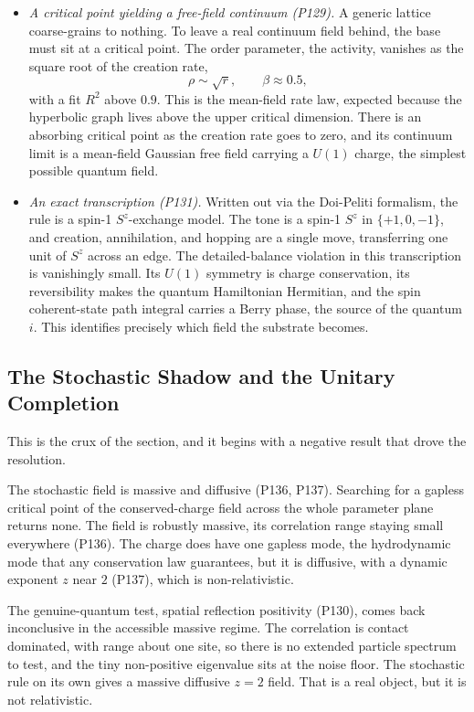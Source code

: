 \begin{itemize}
\item \emph{A critical point yielding a free-field continuum (P129).} A generic lattice coarse-grains to nothing. To leave a real continuum field behind, the base must sit at a critical point. The order parameter, the activity, vanishes as the square root of the creation rate,
\begin{equation}
\rho \sim \sqrt{r}, \qquad \beta \approx 0.5,
\end{equation}
with a fit $R^2$ above $0.9$. This is the mean-field rate law, expected because the hyperbolic graph lives above the upper critical dimension. There is an absorbing critical point as the creation rate goes to zero, and its continuum limit is a mean-field Gaussian free field carrying a $U(1)$ charge, the simplest possible quantum field.

\item \emph{An exact transcription (P131).} Written out via the Doi-Peliti formalism, the rule is a spin-1 $S^z$-exchange model. The tone is a spin-1 $S^z$ in $\{+1,0,-1\}$, and creation, annihilation, and hopping are a single move, transferring one unit of $S^z$ across an edge. The detailed-balance violation in this transcription is vanishingly small. Its $U(1)$ symmetry is charge conservation, its reversibility makes the quantum Hamiltonian Hermitian, and the spin coherent-state path integral carries a Berry phase, the source of the quantum $i$. This identifies precisely which field the substrate becomes.
\end{itemize}

\subsection{The Stochastic Shadow and the Unitary Completion}

This is the crux of the section, and it begins with a negative result that drove the resolution.

The stochastic field is massive and diffusive (P136, P137). Searching for a gapless critical point of the conserved-charge field across the whole parameter plane returns none. The field is robustly massive, its correlation range staying small everywhere (P136). The charge does have one gapless mode, the hydrodynamic mode that any conservation law guarantees, but it is diffusive, with a dynamic exponent $z$ near $2$ (P137), which is non-relativistic.

The genuine-quantum test, spatial reflection positivity (P130), comes back inconclusive in the accessible massive regime. The correlation is contact dominated, with range about one site, so there is no extended particle spectrum to test, and the tiny non-positive eigenvalue sits at the noise floor. The stochastic rule on its own gives a massive diffusive $z=2$ field. That is a real object, but it is not relativistic.

